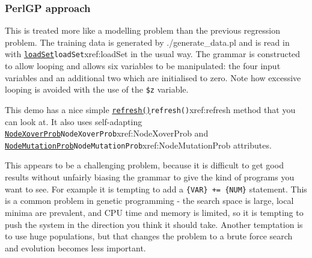 \documentclass[a4paper]{article}
\begin{document}
\subsubsection{PerlGP approach}

This is treated more like a modelling problem than the previous
regression problem.  The training data is generated by
./generate\_data.pl and is read in with
\hyperref[no]{\texttt{loadSet}}{\texttt{loadSet}}{xref:loadSet} in the
usual way.  The grammar is constructed to allow looping and allows six
variables to be manipulated: the four input variables and an
additional two which are initialised to zero.  Note how excessive
looping is avoided with the use of the \texttt{\$z} variable.

This demo has a nice simple \hyperref[no]{\texttt{refresh()}}{\texttt{refresh()}}{xref:refresh} method that you can
look at.  It also uses self-adapting \hyperref[no]{\texttt{NodeXoverProb}}{\texttt{NodeXoverProb}}{xref:NodeXoverProb} and
\hyperref[no]{\texttt{NodeMutationProb}}{\texttt{NodeMutationProb}}{xref:NodeMutationProb} attributes.

This appears to be a challenging problem, because it is difficult to
get good results without unfairly biasing the grammar to give the kind
of programs you want to see.  For example it is tempting to add a
\verb:{VAR} += {NUM}: statement.  This is a common problem in genetic
programming - the search space is large, local minima are prevalent,
and CPU time and memory is limited, so it is tempting to push the
system in the direction you think it should take.  Another temptation
is to use huge populations, but that changes the problem to a brute
force search and evolution becomes less important.



\end{document}

